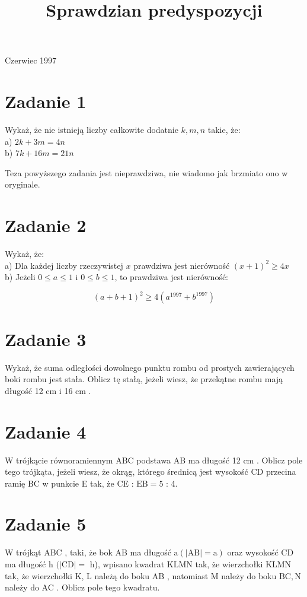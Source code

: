\documentclass[10pt]{article}
\title{Sprawdzian predyspozycji }
\author{}
\date{}
\begin{document}
\maketitle
Czerwiec 1997

\section*{Zadanie 1}
Wykaż, że nie istnieją liczby całkowite dodatnie \(k, m, n\) takie, że:\\
a) \(2 k+3 m=4 n\)\\
b) \(7 k+16 m=21 n\)

Teza powyższego zadania jest nieprawdziwa, nie wiadomo jak brzmiato ono w oryginale.

\section*{Zadanie 2}
Wykaż, że:\\
a) Dla każdej liczby rzeczywistej \(x\) prawdziwa jest nierówność \((x+1)^{2} \geq 4 x\)\\
b) Jeżeli \(0 \leq a \leq 1\) i \(0 \leq b \leq 1\), to prawdziwa jest nierówność:

\[
(a+b+1)^{2} \geq 4\left(a^{1997}+b^{1997}\right)
\]

\section*{Zadanie 3}
Wykaż, że suma odległości dowolnego punktu rombu od prostych zawierających boki rombu jest stała. Oblicz tę stałą, jeżeli wiesz, że przekątne rombu mają długość 12 cm i 16 cm .

\section*{Zadanie 4}
W trójkącie równoramiennym ABC podstawa AB ma długość 12 cm . Oblicz pole tego trójkąta, jeżeli wiesz, że okrąg, którego średnicą jest wysokość CD przecina ramię BC w punkcie E tak, że CE : \(\mathrm{EB}=5\) : 4.

\section*{Zadanie 5}
W trójkąt ABC , taki, że bok AB ma długość \(\mathrm{a}(|\mathrm{AB}|=\mathrm{a})\) oraz wysokość CD ma długość h \((|\mathrm{CD}|=\) h), wpisano kwadrat KLMN tak, że wierzchołki KLMN tak, że wierzchołki K, L należą do boku AB , natomiast M należy do boku \(\mathrm{BC}, \mathrm{N}\) należy do AC . Oblicz pole tego kwadratu.
\end{document}
